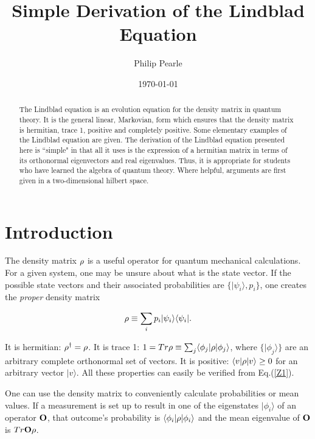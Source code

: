 \documentclass[aps,pra,twocolumn,amssymb, amsfonts,amsmath,showpacs, superscriptaddress]{revtex4}
\begin{document}
  
  \title{Simple Derivation of the Lindblad Equation}
\author{Philip Pearle}
\date{\today}
\begin{abstract}
{The Lindblad equation is an evolution equation for the density matrix in quantum theory.  It is the general linear,  Markovian, form which ensures that the density matrix is hermitian, trace 1, positive and completely positive. Some elementary examples of the Lindblad equation are given. The derivation of the Lindblad  equation presented here is ``simple" in  that all it uses is the expression of a hermitian matrix in terms of its orthonormal eigenvectors and real eigenvalues.  Thus, it is appropriate for students who have learned the algebra of quantum theory. Where helpful, arguments are first given in a two-dimensional hilbert space. } 
\end{abstract}

\maketitle

\section{Introduction}

The density matrix ${\bf\rho}$ is a useful operator for quantum mechanical calculations.  For a given system, one may be unsure about what is the state vector.  If the possible state vectors and their associated probabilities are $\{|\psi_{i}\rangle, p_{i}\}$, one creates the \textit{proper}\cite{dEspagnat} density matrix 

\begin{equation}\label{Z1}
{\bf\rho}\equiv \sum_{i}p_{i}|\psi_{i}\rangle\langle\psi_{i}|.
\end{equation}

It is hermitian: ${\bf\rho}^{\dagger}={\bf\rho}$.  It is trace 1: $1= Tr{\bf\rho}\equiv \sum_{j}\langle \phi_{j}|{\bf\rho}|\phi_{j} \rangle$, where $\{|\phi_{j}\rangle\}$ are an arbitrary complete orthonormal set of vectors.  It is positive:  $\langle v|{\bf\rho}|v\rangle\geq 0$ for an arbitrary vector $ |v\rangle$.  All these properties can easily be verified from Eq.(\ref{Z1}).  

One can use the density matrix to conveniently calculate probabilities or mean values.  If a measurement is set up to result in one of the eigenstates  $|\phi_{i}\rangle$ of an operator ${\bf O}$, that outcome's probability is $\langle\phi_{i}|{\bf\rho}|\phi_{i}\rangle$ and the mean eigenvalue of ${\bf O}$ is $Tr{\bf O}{\bf\rho}$.
\end{document}
